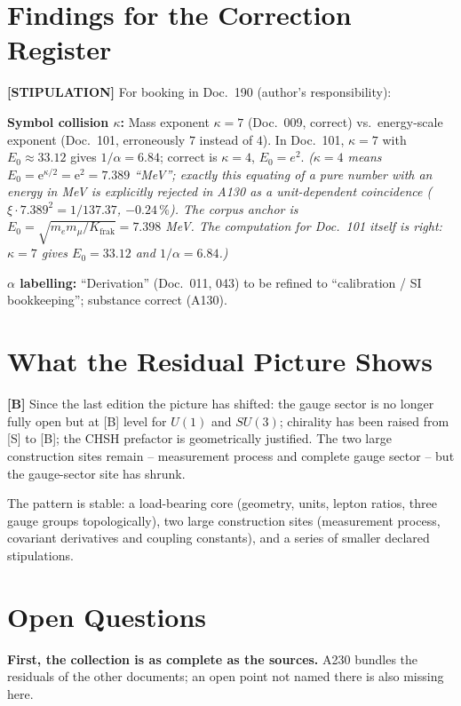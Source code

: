\section{Findings for the Correction Register}

\textbf{[STIPULATION]} For booking in Doc.~190 (author's responsibility):

\textbf{Symbol collision $\kappa$:} Mass exponent $\kappa=7$ (Doc.~009, correct)
vs.\ energy-scale exponent (Doc.~101, erroneously $7$ instead of $4$). In
Doc.~101, $\kappa=7$ with $E_0\approx33{.}12$ gives $1/\alpha=6{.}84$; correct
is $\kappa=4$, $E_0=e^2$. \textit{($\kappa=4$ means $E_0=\mathrm{e}^{\kappa/2}=\mathrm{e}^2=7.389$ \enquote{MeV}; exactly this equating of a pure number with an energy in MeV is explicitly rejected in A130 as a unit-dependent coincidence ($\xi\cdot7.389^2=1/137.37$, $-0{.}24\,\%$). The corpus anchor is $E_0=\sqrt{m_em_\mu/K_\text{frak}}=7.398$ MeV. The computation for Doc.~101 itself is right: $\kappa=7$ gives $E_0=33.12$ and $1/\alpha=6.84$.)}

\textbf{$\alpha$ labelling:} ``Derivation'' (Doc.~011, 043) to be refined to
``calibration / SI bookkeeping''; substance correct (A130).

\section{What the Residual Picture Shows}

\textbf{[B]} Since the last edition the picture has shifted: the gauge sector is
no longer fully open but at [B] level for $U(1)$ and $SU(3)$; chirality has been
raised from [S] to [B]; the CHSH prefactor is geometrically justified. The two
large construction sites remain -- measurement process and complete gauge sector
-- but the gauge-sector site has shrunk.

The pattern is stable: a load-bearing core (geometry, units, lepton ratios, three
gauge groups topologically), two large construction sites (measurement process,
covariant derivatives and coupling constants), and a series of smaller declared
stipulations.

\section{Open Questions}

\textbf{First, the collection is as complete as the sources.} A230 bundles the
residuals of the other documents; an open point not named there is also missing here.

